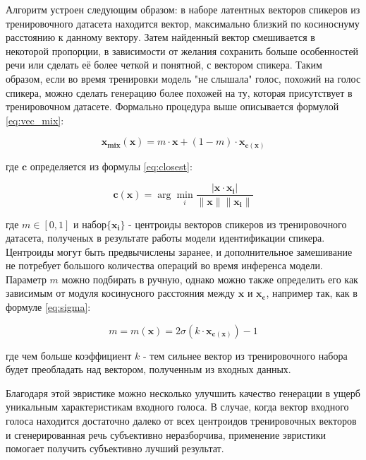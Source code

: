 \documentclass[oneside,final,14pt]{extreport}
\begin{document}
Алгоритм устроен следующим образом: в наборе латентных векторов спикеров из тренировочного датасета находится вектор, максимально близкий по косиноснуму расстоянию к данному вектору. Затем найденный вектор смешивается в некоторой пропорции, в зависимости от желания сохранить больше особенностей речи или сделать её более четкой и понятной, с вектором спикера. Таким образом, если во время тренировки модель "не слышала" голос, похожий на голос спикера, можно сделать генерацию более похожей на ту, которая присутствует в тренировочном датасете. Формально процедура выше описывается формулой  \ref{eq:vec_mix}:

$$
\begin{equation}
\mathbf{x_{mix}}(\mathbf{x}) = m \cdot \mathbf{x} + (1-m) \cdot \mathbf{x_{c(\mathbf{x})}}
\label{eq:vec_mix}
\end{equation}
$$

где $\mathbf{c}$ определяется из формулы \ref{eq:closest}:

$$
\begin{equation}
\mathbf{c}(\mathbf{x}) = \arg \min_i \frac{|  \mathbf{x} \cdot \mathbf{x_i}|}{\|\mathbf{x}\|\|\mathbf{x_i}\|}
\label{eq:closest}
\end{equation}
$$

где $m \in [0, 1]$ и набор$\{\mathbf{x_i}\}$ - центроиды векторов спикеров из тренировочного датасета,  полученых в результате работы модели идентификации спикера. Центроиды могут быть предвычислены заранее, и дополнительное замешивание  не потребует большого количества операций во время инференса модели. Параметр $m$ можно подбирать в ручную, однако можно также определить его как зависимым от модуля косинусного расстояния между $\mathbf{x}$ и $\mathbf{x_c}$, например так, как в формуле \ref{eq:sigma}:

$$
\begin{equation}
m 
= 
m(\mathbf{x})
=
2 \sigma (k \cdot
\mathbf{x_{c(x)}})
- 1
\label{eq:sigma}
\end{equation}
$$

где чем больше коэффициент $k$ - тем сильнее вектор из тренировочного набора будет преобладать над вектором, полученным из входных данных.


Благодаря этой эвристике можно несколько улучшить качество генерации в ущерб уникальным характеристикам входного голоса. В случае, когда вектор входного голоса находится достаточно далеко от всех центроидов тренировочных векторов и сгенерированная речь субъективно неразборчива, применение эвристики помогает получить субъективно лучший результат. 
\end{document}
